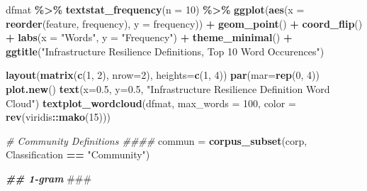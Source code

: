\documentclass[
]{article}
\newenvironment{Shaded}{\begin{snugshade}}{\end{snugshade}}
\newcommand{\AlertTok}[1]{\textcolor[rgb]{0.94,0.16,0.16}{#1}}
\newcommand{\AttributeTok}[1]{\textcolor[rgb]{0.13,0.29,0.53}{#1}}
\newcommand{\CommentTok}[1]{\textcolor[rgb]{0.56,0.35,0.01}{\textit{#1}}}
\newcommand{\DecValTok}[1]{\textcolor[rgb]{0.00,0.00,0.81}{#1}}
\newcommand{\DocumentationTok}[1]{\textcolor[rgb]{0.56,0.35,0.01}{\textbf{\textit{#1}}}}
\newcommand{\FloatTok}[1]{\textcolor[rgb]{0.00,0.00,0.81}{#1}}
\newcommand{\FunctionTok}[1]{\textcolor[rgb]{0.13,0.29,0.53}{\textbf{#1}}}
\newcommand{\NormalTok}[1]{#1}
\newcommand{\OtherTok}[1]{\textcolor[rgb]{0.56,0.35,0.01}{#1}}
\newcommand{\SpecialCharTok}[1]{\textcolor[rgb]{0.81,0.36,0.00}{\textbf{#1}}}
\newcommand{\StringTok}[1]{\textcolor[rgb]{0.31,0.60,0.02}{#1}}
\begin{document}
\begin{Shaded}
\begin{Highlighting}[]
\NormalTok{dfmat }\SpecialCharTok{\%\textgreater{}\%} 
  \FunctionTok{textstat\_frequency}\NormalTok{(}\AttributeTok{n =} \DecValTok{10}\NormalTok{) }\SpecialCharTok{\%\textgreater{}\%} 
  \FunctionTok{ggplot}\NormalTok{(}\FunctionTok{aes}\NormalTok{(}\AttributeTok{x =} \FunctionTok{reorder}\NormalTok{(feature, frequency), }\AttributeTok{y =}\NormalTok{ frequency)) }\SpecialCharTok{+}
  \FunctionTok{geom\_point}\NormalTok{() }\SpecialCharTok{+}
  \FunctionTok{coord\_flip}\NormalTok{() }\SpecialCharTok{+}
  \FunctionTok{labs}\NormalTok{(}\AttributeTok{x =} \StringTok{"Words"}\NormalTok{, }\AttributeTok{y =} \StringTok{"Frequency"}\NormalTok{) }\SpecialCharTok{+}
  \FunctionTok{theme\_minimal}\NormalTok{() }\SpecialCharTok{+} 
  \FunctionTok{ggtitle}\NormalTok{(}\StringTok{"Infrastructure Resilience Definitions, Top 10 Word Occurences"}\NormalTok{)}

\FunctionTok{layout}\NormalTok{(}\FunctionTok{matrix}\NormalTok{(}\FunctionTok{c}\NormalTok{(}\DecValTok{1}\NormalTok{, }\DecValTok{2}\NormalTok{), }\AttributeTok{nrow=}\DecValTok{2}\NormalTok{), }\AttributeTok{heights=}\FunctionTok{c}\NormalTok{(}\DecValTok{1}\NormalTok{, }\DecValTok{4}\NormalTok{))}
\FunctionTok{par}\NormalTok{(}\AttributeTok{mar=}\FunctionTok{rep}\NormalTok{(}\DecValTok{0}\NormalTok{, }\DecValTok{4}\NormalTok{))}
\FunctionTok{plot.new}\NormalTok{()}
\FunctionTok{text}\NormalTok{(}\AttributeTok{x=}\FloatTok{0.5}\NormalTok{, }\AttributeTok{y=}\FloatTok{0.5}\NormalTok{, }\StringTok{"Infrastructure Resilience Definition Word Cloud"}\NormalTok{)}
\FunctionTok{textplot\_wordcloud}\NormalTok{(dfmat, }\AttributeTok{max\_words =} \DecValTok{100}\NormalTok{, }\AttributeTok{color =} \FunctionTok{rev}\NormalTok{(viridis}\SpecialCharTok{::}\FunctionTok{mako}\NormalTok{(}\DecValTok{15}\NormalTok{)))}

\CommentTok{\# Community Definitions \#\#\#\#}
\NormalTok{commun }\OtherTok{=} \FunctionTok{corpus\_subset}\NormalTok{(corp, Classification }\SpecialCharTok{==} \StringTok{"Community"}\NormalTok{)}

\DocumentationTok{\#\# 1{-}gram }\AlertTok{\#\#\#}


\end{Highlighting}
\end{Shaded}
\end{document}
